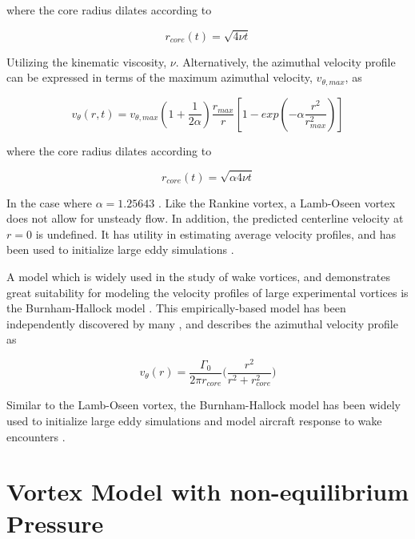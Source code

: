 \noindent
where the core radius dilates according to 

\begin{equation}
r_{core}(t) = \sqrt{4 \nu t}
	\label{eq:lamb2}
\end{equation}

\noindent
Utilizing the kinematic viscosity, $\nu$. Alternatively, the azimuthal velocity 
profile can be expressed in terms of the maximum azimuthal velocity, 
$v_{\theta, max}$, as

\begin{equation}
v_{\theta}(r,t) = v_{\theta, max} (1 + \frac{1}{2 \alpha}) \frac{r_{max}}{r} 
[1 - exp(- \alpha \frac{r^2}{r_{max}^2})]
\label{eq:lamb3}
\end{equation}

\noindent
where the core radius dilates according to 

\begin{equation}
r_{core}(t) = \sqrt{\alpha 4 \nu t}
\label{eq:lamb4}
\end{equation}

\noindent
In the case where $\alpha = 1.25643$ \cite{davenport1996}. Like the Rankine 
vortex, a 
Lamb-Oseen vortex does not allow for unsteady flow. In addition, the predicted 
centerline velocity at $r=0$ is undefined. It has utility in estimating average 
velocity profiles, and has been used to initialize large eddy 
simulations \cite{hennemann2011}.

A model which is widely used in the study of wake vortices, and demonstrates 
great suitability for modeling the velocity profiles of large experimental 
vortices is the Burnham-Hallock model \cite{burnham1982}. This 
empirically-based model has been independently discovered by many 
\cite{burnam2013}, and describes the azimuthal velocity profile as

\begin{equation}
v_{\theta}(r) = \frac{\Gamma_0}{2 \pi r_{core}} \Big(\frac{r^2}{r^2 + 
r_{core}^2} \Big)
\label{eq:burnham-hallock}
\end{equation}

\noindent
Similar to the Lamb-Oseen vortex, the Burnham-Hallock model has been widely 
used to initialize large eddy simulations and model aircraft response to wake 
encounters \cite{ahmad2014}.

\section{Vortex Model with non-equilibrium Pressure}

